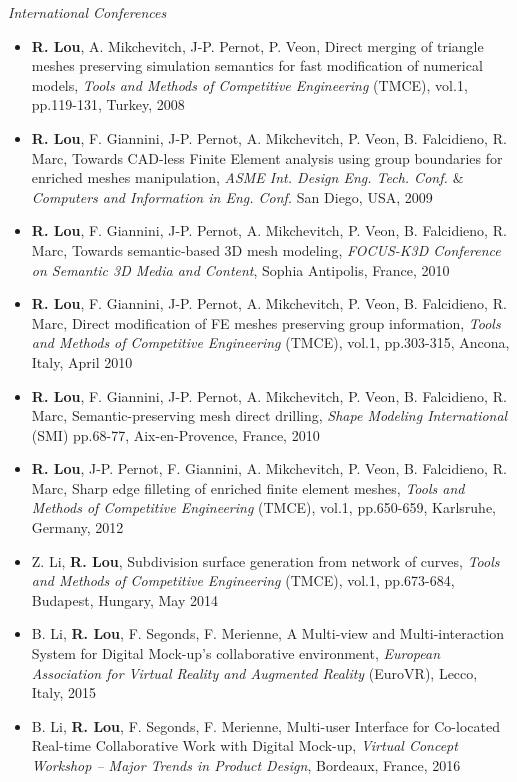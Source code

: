 \documentclass{res}
\begin{document}
\begin{resume}
{\sl International Conferences}  
\begin{itemize}
		\item {\bf R. Lou}, A. Mikchevitch, J-P. Pernot, P. Veon, Direct merging of triangle meshes preserving simulation semantics for fast modification of numerical models, {\it  Tools and Methods of Competitive Engineering} (TMCE), vol.1, pp.119-131, Turkey, 2008
		\item {\bf R. Lou}, F. Giannini, J-P. Pernot, A. Mikchevitch, P. Veon, B. Falcidieno, R. Marc, Towards CAD-less Finite Element analysis using group boundaries for enriched meshes manipulation, {\it  ASME Int. Design Eng. Tech. Conf. $\&$ Computers and Information in Eng. Conf.} San Diego, USA, 2009
		\item {\bf R. Lou}, F. Giannini, J-P. Pernot, A. Mikchevitch, P. Veon, B. Falcidieno, R. Marc, Towards semantic-based 3D mesh modeling, {\it  FOCUS-K3D Conference on Semantic 3D Media and Content}, Sophia Antipolis, France, 2010
		\item {\bf R. Lou}, F. Giannini, J-P. Pernot, A. Mikchevitch, P. Veon, B. Falcidieno, R. Marc, Direct modification of FE meshes preserving group information, {\it  Tools and Methods of Competitive Engineering} (TMCE), vol.1, pp.303-315, Ancona, Italy, April 2010
		\item {\bf R. Lou}, F. Giannini, J-P. Pernot, A. Mikchevitch, P. Veon, B. Falcidieno, R. Marc, Semantic-preserving mesh direct drilling, {\it  Shape Modeling International} (SMI) pp.68-77, Aix-en-Provence, France, 2010
		\item {\bf R. Lou}, J-P. Pernot, F. Giannini, A. Mikchevitch, P. Veon, B. Falcidieno, R. Marc, Sharp edge filleting of enriched finite element meshes, {\it  Tools and Methods of Competitive Engineering} (TMCE), vol.1, pp.650-659, Karlsruhe, Germany, 2012
		\item Z. Li, {\bf R. Lou}, Subdivision surface generation from network of curves, {\it  Tools and Methods of Competitive Engineering} (TMCE),  vol.1, pp.673-684, Budapest, Hungary, May 2014
		\item B. Li, {\bf R. Lou}, F. Segonds, F. Merienne, A Multi-view and Multi-interaction System for Digital Mock-up's  collaborative environment, {\it  European Association for Virtual Reality and Augmented Reality} (EuroVR), Lecco, Italy, 2015
		\item B. Li, {\bf R. Lou}, F. Segonds, F. Merienne, Multi-user Interface for Co-located Real-time Collaborative Work with Digital Mock-up, {\it  Virtual Concept Workshop -- Major Trends in Product Design}, Bordeaux, France, 2016

\end{itemize}
\end{resume}
\end{document}
